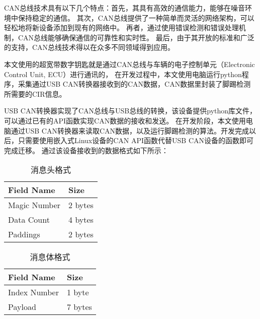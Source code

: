 CAN总线技术具有以下几个特点：首先，其具有高效的通信能力，能够在噪音环境中保持稳定的通信。
其次，CAN总线提供了一种简单而灵活的网络架构，可以轻松地将新设备添加到现有的网络中。
再者，通过使用错误检测和错误处理机制，CAN总线能够确保通信的可靠性和实时性。
最后，由于其开放的标准和广泛的支持，CAN总线技术得以在众多不同领域得到应用。

本文使用的超宽带数字钥匙就是通过CAN总线与车辆的电子控制单元（Electronic Control Unit, ECU）进行通讯的，
在开发过程中，本文使用电脑运行python程序，采集通过USB CAN转换器接收到的CAN数据，CAN数据里封装了脚踢检测所需要的CIR信息。

USB CAN转换器实现了CAN总线与USB总线的转换，该设备提供python库文件，可以通过已有的API函数实现CAN数据的接收和发送。
在开发阶段，本文使用电脑通过USB CAN转换器来读取CAN数据，以及运行脚踢检测的算法。开发完成以后，只需要使用嵌入式Linux设备的CAN API函数代替USB CAN设备的函数即可完成迁移。
通过该设备接收到的数据格式如下所示：

\noindent
\begin{minipage}{.5\textwidth}
    \begin{table}[H]
        \caption{\label{tab:Header}消息头格式}
        \centering
        \begin{tabular}{|l|l|}
        \hline
        Field Name & Size \\
        \hline
        Magic Number & 2 bytes \\
        \hline
        Data Count & 4 bytes \\
        \hline
        Paddings & 2 bytes \\
        \hline
        \end{tabular}
    \end{table}
\end{minipage}%
\begin{minipage}{.5\textwidth}
    \begin{table}[H]
        \caption{\label{tab:Payload}消息体格式}
        \centering
        \begin{tabular}{|l|l|}
        \hline
        Field Name & Size \\
        \hline
        Index Number & 1 byte \\
        \hline
        Payload & 7 bytes \\
        \hline
        \end{tabular}
    \end{table}
\end{minipage}
\vspace{\baselineskip} %

